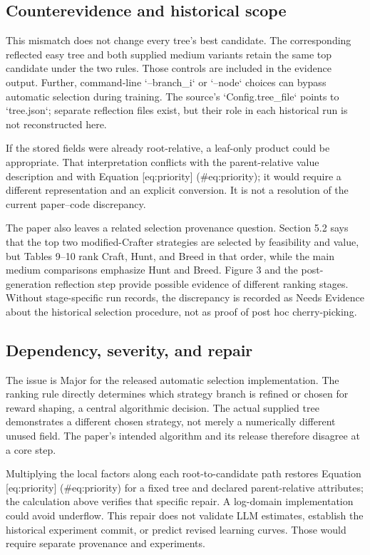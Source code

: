 \documentclass[10pt]{article}
\begin{document}
\subsection*{Counterevidence and historical scope}
This mismatch does not change every tree’s best candidate. The corresponding reflected easy tree and both supplied medium variants retain the same top candidate under the two rules. Those controls are included in the evidence output. Further, command-line `–branch\_i` or `–node` choices can bypass automatic selection during training. The source’s `Config.tree\_file` points to `tree.json`; separate reflection files exist, but their role in each historical run is not reconstructed here.\par
If the stored fields were already root-relative, a leaf-only product could be appropriate. That interpretation conflicts with the parent-relative value description and with Equation [eq:priority] (\#eq:priority); it would require a different representation and an explicit conversion. It is not a resolution of the current paper–code discrepancy.\par
The paper also leaves a related selection provenance question. Section 5.2 says that the top two modified-Crafter strategies are selected by feasibility and value, but Tables 9–10 rank Craft, Hunt, and Breed in that order, while the main medium comparisons emphasize Hunt and Breed. Figure 3 and the post-generation reflection step provide possible evidence of different ranking stages. Without stage-specific run records, the discrepancy is recorded as Needs Evidence about the historical selection procedure, not as proof of post hoc cherry-picking.\par
\subsection*{Dependency, severity, and repair}
The issue is Major for the released automatic selection implementation. The ranking rule directly determines which strategy branch is refined or chosen for reward shaping, a central algorithmic decision. The actual supplied tree demonstrates a different chosen strategy, not merely a numerically different unused field. The paper’s intended algorithm and its release therefore disagree at a core step.\par
Multiplying the local factors along each root-to-candidate path restores Equation [eq:priority] (\#eq:priority) for a fixed tree and declared parent-relative attributes; the calculation above verifies that specific repair. A log-domain implementation could avoid underflow. This repair does not validate LLM estimates, establish the historical experiment commit, or predict revised learning curves. Those would require separate provenance and experiments.\par
\end{document}

